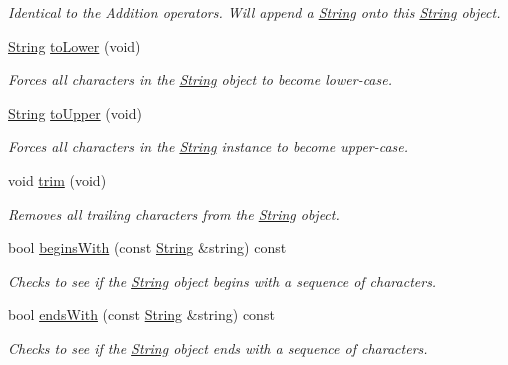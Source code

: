 \begin{DoxyCompactItemize}
\begin{DoxyCompactList}\small\item\em Identical to the Addition operators. Will append a \hyperlink{classsparky_1_1_string}{String} onto this \hyperlink{classsparky_1_1_string}{String} object. \end{DoxyCompactList}\item 
\hyperlink{classsparky_1_1_string}{String} \hyperlink{classsparky_1_1_string_a238b3343c95acef5adce4c10787c0915}{to\+Lower} (void)
\begin{DoxyCompactList}\small\item\em Forces all characters in the \hyperlink{classsparky_1_1_string}{String} object to become lower-\/case. \end{DoxyCompactList}\item 
\hyperlink{classsparky_1_1_string}{String} \hyperlink{classsparky_1_1_string_a616ca7714a6ff404429fb0020c328da0}{to\+Upper} (void)
\begin{DoxyCompactList}\small\item\em Forces all characters in the \hyperlink{classsparky_1_1_string}{String} instance to become upper-\/case. \end{DoxyCompactList}\item 
void \hyperlink{classsparky_1_1_string_a83cb0c935ffee2e1ac4aa92cab5b60c9}{trim} (void)
\begin{DoxyCompactList}\small\item\em Removes all trailing characters from the \hyperlink{classsparky_1_1_string}{String} object. \end{DoxyCompactList}\item 
bool \hyperlink{classsparky_1_1_string_ae14f24018af5e1978aa92b0450721cac}{begins\+With} (const \hyperlink{classsparky_1_1_string}{String} \&string) const 
\begin{DoxyCompactList}\small\item\em Checks to see if the \hyperlink{classsparky_1_1_string}{String} object begins with a sequence of characters. \end{DoxyCompactList}\item 
bool \hyperlink{classsparky_1_1_string_a084bb1d3364ccc7e48942070d7b2ca30}{ends\+With} (const \hyperlink{classsparky_1_1_string}{String} \&string) const 
\begin{DoxyCompactList}\small\item\em Checks to see if the \hyperlink{classsparky_1_1_string}{String} object ends with a sequence of characters. \end{DoxyCompactList}\item 

\end{DoxyCompactItemize}
